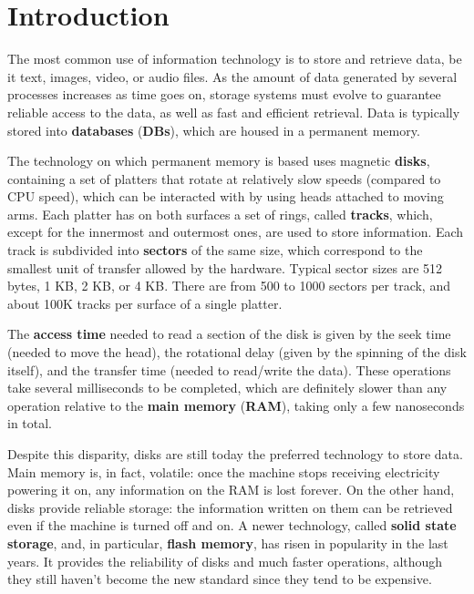 \chapter{Introduction}

The most common use of information technology is to store and retrieve data, be it text, images, video, or audio files. As the amount of data generated by several processes increases as time goes on, storage systems must evolve to guarantee reliable access to the data, as well as fast and efficient retrieval. Data is typically stored into \textbf{databases} (\textbf{DBs}), which are housed in a permanent memory.

The technology on which permanent memory is based uses magnetic \textbf{disks}, containing a set of platters that rotate at relatively slow speeds (compared to CPU speed), which can be interacted with by using heads attached to moving arms. Each platter has on both surfaces a set of rings, called \textbf{tracks}, which, except for the innermost and outermost ones, are used to store information. Each track is subdivided into \textbf{sectors} of the same size, which correspond to the smallest unit of transfer allowed by the hardware. Typical sector sizes are 512 bytes, 1 KB, 2 KB, or 4 KB. There are from 500 to 1000 sectors per track, and about 100K tracks per surface of a single platter.

The \textbf{access time} needed to read a section of the disk is given by the seek time (needed to move the head), the rotational delay (given by the spinning of the disk itself), and the transfer time (needed to read/write the data). These operations take several milliseconds to be completed, which are definitely slower than any operation relative to the \textbf{main memory} (\textbf{RAM}), taking only a few nanoseconds in total. 

Despite this disparity, disks are still today the preferred technology to store data. Main memory is, in fact, volatile: once the machine stops receiving electricity powering it on, any information on the RAM is lost forever. On the other hand, disks provide reliable storage: the information written on them can be retrieved even if the machine is turned off and on. A newer technology, called \textbf{solid state storage}, and, in particular, \textbf{flash memory}, has risen in popularity in the last years. It provides the reliability of disks and much faster operations, although they still haven't become the new standard since they tend to be expensive.